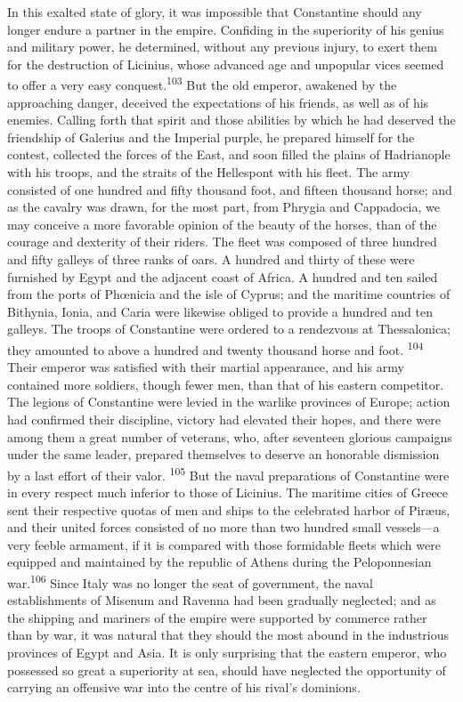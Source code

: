 In this exalted state of glory, it was impossible that
Constantine should any longer endure a partner in the empire.
Confiding in the superiority of his genius and military power, he
determined, without any previous injury, to exert them for the
destruction of Licinius, whose advanced age and unpopular vices
seemed to offer a very easy conquest.\textsuperscript{103} But the old emperor,
awakened by the approaching danger, deceived the expectations of
his friends, as well as of his enemies. Calling forth that spirit
and those abilities by which he had deserved the friendship of
Galerius and the Imperial purple, he prepared himself for the
contest, collected the forces of the East, and soon filled the
plains of Hadrianople with his troops, and the straits of the
Hellespont with his fleet. The army consisted of one hundred and
fifty thousand foot, and fifteen thousand horse; and as the
cavalry was drawn, for the most part, from Phrygia and
Cappadocia, we may conceive a more favorable opinion of the
beauty of the horses, than of the courage and dexterity of their
riders. The fleet was composed of three hundred and fifty galleys
of three ranks of oars. A hundred and thirty of these were
furnished by Egypt and the adjacent coast of Africa. A hundred
and ten sailed from the ports of Phœnicia and the isle of Cyprus;
and the maritime countries of Bithynia, Ionia, and Caria were
likewise obliged to provide a hundred and ten galleys. The troops
of Constantine were ordered to a rendezvous at Thessalonica; they
amounted to above a hundred and twenty thousand horse and foot. \textsuperscript{104}
Their emperor was satisfied with their martial appearance,
and his army contained more soldiers, though fewer men, than that
of his eastern competitor. The legions of Constantine were levied
in the warlike provinces of Europe; action had confirmed their
discipline, victory had elevated their hopes, and there were
among them a great number of veterans, who, after seventeen
glorious campaigns under the same leader, prepared themselves to
deserve an honorable dismission by a last effort of their valor. \textsuperscript{105}
But the naval preparations of Constantine were in every
respect much inferior to those of Licinius. The maritime cities
of Greece sent their respective quotas of men and ships to the
celebrated harbor of Piræus, and their united forces consisted of
no more than two hundred small vessels—a very feeble armament, if
it is compared with those formidable fleets which were equipped
and maintained by the republic of Athens during the Peloponnesian
war.\textsuperscript{106} Since Italy was no longer the seat of government, the
naval establishments of Misenum and Ravenna had been gradually
neglected; and as the shipping and mariners of the empire were
supported by commerce rather than by war, it was natural that
they should the most abound in the industrious provinces of Egypt
and Asia. It is only surprising that the eastern emperor, who
possessed so great a superiority at sea, should have neglected
the opportunity of carrying an offensive war into the centre of
his rival’s dominions.


